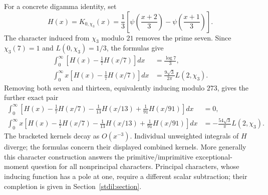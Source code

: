 For a concrete digamma identity, set
\[
 H(x)=K_{0,\chi_3}(x)
     =\frac13\left[\psi\left(\frac{x+2}3\right)
                    -\psi\left(\frac{x+1}3\right)\right].
\]
The character induced from $\chi_3$ modulo $21$ removes the prime seven.
Since $\chi_3(7)=1$ and $L(0,\chi_3)=1/3$, the formulas give
\begin{align}
 \int_0^\infty\left[H(x)-\frac17H(x/7)\right]dx
      &=\frac{\log7}3,\label{stchar:21zero}\\
 \int_0^\infty x\left[H(x)-\frac17H(x/7)\right]dx
      &=\frac{9\sqrt3}{2\pi}L(2,\chi_3).
        \label{stchar:21first}
\end{align}
Removing both seven and thirteen, equivalently inducing modulo $273$,
gives the further exact pair
\begin{align}
 \int_0^\infty\left[H(x)-\frac17H(x/7)-\frac1{13}H(x/13)
                         +\frac1{91}H(x/91)\right]dx&=0,
                         \label{stchar:273zero}\\
 \int_0^\infty x\left[H(x)-\frac17H(x/7)-\frac1{13}H(x/13)
                         +\frac1{91}H(x/91)\right]dx
     &=-\frac{54\sqrt3}{\pi}L(2,\chi_3).
                         \label{stchar:273first}
\end{align}
The bracketed kernels decay as $O(x^{-3})$.  Individual unweighted
integrals of $H$ diverge; the formulas concern their displayed combined
kernels.  More generally this character construction answers the
primitive/imprimitive exceptional-moment question for all nonprincipal
characters.  Principal characters, whose inducing function has a pole
at one, require a different scalar subtraction; their completion is
given in Section~\ref{stdil:section}.

